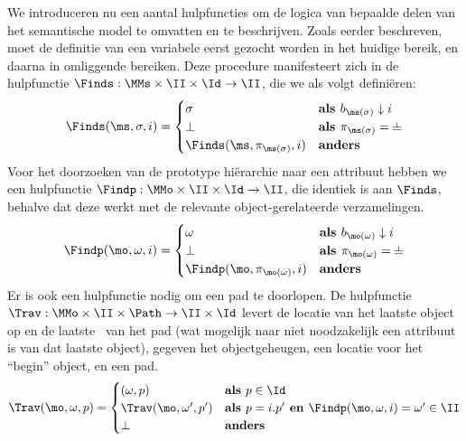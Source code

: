 We introduceren nu een aantal hulpfuncties om de logica van bepaalde delen van het semantische model te omvatten en te beschrijven.
Zoals eerder beschreven, moet de definitie van een variabele eerst gezocht worden in het huidige bereik, en daarna in omliggende bereiken. Deze procedure manifesteert zich in de hulpfunctie $\Finds : \MMs \times \II \times \Id \to \II$, die we als volgt definiëren:
%
\begin{equation*}
  \Finds(\ms, \sigma, i) = \begin{cases}
    \sigma & \textbf{als } b_{\ms(\sigma)} \downarrow i \\
    \bot & \textbf{als } \pi_{\ms(\sigma)} = \nil \\
    \Finds(\ms, \pi_{\ms(\sigma)}, i) & \textbf{anders}
  \end{cases}
\end{equation*}
%
Voor het doorzoeken van de prototype hiërarchie naar een attribuut hebben we een hulpfunctie $\Findp : \MMo \times \II \times \Id \to \II$, die identiek is aan $\Finds$, behalve dat deze werkt met de relevante object-gerelateerde verzamelingen.
%
\begin{equation*}
  \Findp(\mo, \omega, i) = \begin{cases}
    \omega & \textbf{als } b_{\mo(\omega)} \downarrow i \\
    \bot & \textbf{als } \pi_{\mo(\omega)} = \nil \\
    \Findp(\mo, \pi_{\mo(\omega)}, i) & \textbf{anders}
  \end{cases}
\end{equation*}
%
Er is ook een hulpfunctie nodig om een pad te doorlopen. De hulpfunctie $\Trav : \MMo \times \II \times \Path \to \II \times \Id$ levert de locatie van het laatste object op en de laatste \Id\ van het pad (wat mogelijk naar niet noodzakelijk een attribuut is van dat laatste object), gegeven het objectgeheugen, een locatie voor het “begin” object, en een pad.
%
\begin{equation*}
  \Trav(\mo, \omega, p) = \begin{cases}
    (\omega, p) & \textbf{als } p \in \Id \\
    \Trav(\mo, \omega', p') & \textbf{als } p = i.p' \textbf{ en } \Findp(\mo, \omega, i) = \omega' \in \II \\%
    \bot & \textbf{anders}
  \end{cases}
\end{equation*}
%

